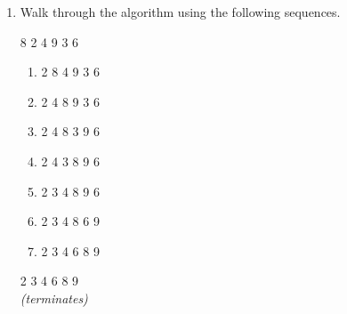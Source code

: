 \documentclass{article}
\begin{document}
\begin{enumerate}
    \item Walk through the algorithm using the following sequences.
          \begin{multicols}{3}
              \begin{center}
                  8 2 4 9 3 6
                  \begin{enumerate}[label=\arabic*.,leftmargin=1cm]
                      \itemsep -0.25em
                      \item 2 8 4 9 3 6
                      \item 2 4 8 9 3 6
                      \item 2 4 8 3 9 6
                      \item 2 4 3 8 9 6
                      \item 2 3 4 8 9 6
                      \item 2 3 4 8 6 9
                      \item 2 3 4 6 8 9
                  \end{enumerate}
              \end{center}
              \vfill\null
              \columnbreak
              \begin{center}
                  2 3 4 6 8 9 \\
                  \textit{(terminates)}
              \end{center}
              \vfill\null
              \columnbreak
              \begin{center}


\end{center}
\end{multicols}
\end{enumerate}
\end{document}
